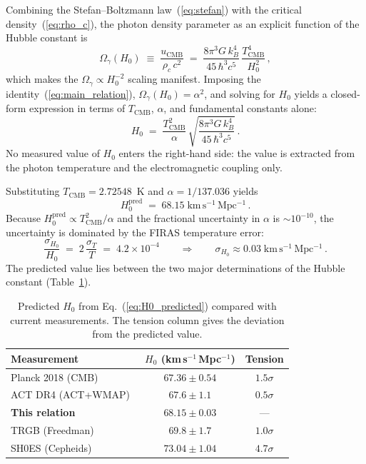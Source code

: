 \documentclass[12pt, a4paper]{article}
\begin{document}
Combining the Stefan--Boltzmann law~(\ref{eq:stefan}) with the critical density~(\ref{eq:rho_c}), the photon density parameter as an explicit function of the Hubble constant is
\begin{equation}
    \Omega_\gamma(H_0) \;\equiv\; \frac{u_{\mathrm{CMB}}}{\rho_c\,c^2}
    \;=\; \frac{8\pi^3 G\,k_B^4}{45\,\hbar^3 c^5}\,\frac{T_{\mathrm{CMB}}^4}{H_0^2}\,,
\label{eq:Omega_of_H0}
\end{equation}
which makes the $\Omega_\gamma \propto H_0^{-2}$ scaling manifest. Imposing the identity~(\ref{eq:main_relation}), $\Omega_\gamma(H_0) = \alpha^2$, and solving for $H_0$ yields a closed-form expression in terms of $T_{\mathrm{CMB}}$, $\alpha$, and fundamental constants alone:
\begin{equation}
    H_0 \;=\; \frac{T_{\mathrm{CMB}}^2}{\alpha}\,\sqrt{\frac{8\pi^3 G\,k_B^4}{45\,\hbar^3 c^5}}\,.
\label{eq:H0_predicted}
\end{equation}
No measured value of $H_0$ enters the right-hand side: the value is extracted from the photon temperature and the electromagnetic coupling only.

Substituting $T_{\mathrm{CMB}} = 2.72548$~K and $\alpha = 1/137.036$ yields
\begin{equation}
    H_0^{\mathrm{pred}} \;=\; 68.15\;\mathrm{km\,s^{-1}\,Mpc^{-1}}\,.
\end{equation}
Because $H_0^{\mathrm{pred}} \propto T_{\mathrm{CMB}}^2/\alpha$ and the fractional uncertainty in $\alpha$ is $\sim 10^{-10}$, the uncertainty is dominated by the FIRAS temperature error:
\begin{equation}
    \frac{\sigma_{H_0}}{H_0} \;=\; 2\,\frac{\sigma_T}{T} \;=\; 4.2\times 10^{-4}
    \qquad\Longrightarrow\qquad \sigma_{H_0} \approx 0.03\;\mathrm{km\,s^{-1}\,Mpc^{-1}}\,.
\label{eq:sigma_H0}
\end{equation}
The predicted value lies between the two major determinations of the Hubble constant (Table~\ref{tab:comparison}).

\begin{table}[H]
\centering
\caption{Predicted $H_0$ from Eq.~(\ref{eq:H0_predicted}) compared with current measurements. The tension column gives the deviation from the predicted value.}
\label{tab:comparison}
\begin{tabular}{lcc}
\toprule
Measurement & $H_0$ (km\,s$^{-1}$\,Mpc$^{-1}$) & Tension \\
\midrule
Planck 2018 (CMB)~\cite{planck_2018} & $67.36 \pm 0.54$ & $1.5\sigma$ \\
ACT DR4 (ACT+WMAP)~\cite{aiola_2020} & $67.6 \pm 1.1$ & $0.5\sigma$ \\
\textbf{This relation} & $\mathbf{68.15 \pm 0.03}$ & --- \\
TRGB (Freedman)~\cite{freedman_2021} & $69.8 \pm 1.7$ & $1.0\sigma$ \\
SH0ES (Cepheids)~\cite{riess_2022} & $73.04 \pm 1.04$ & $4.7\sigma$ \\
\bottomrule
\end{tabular}
\end{table}
\end{document}
